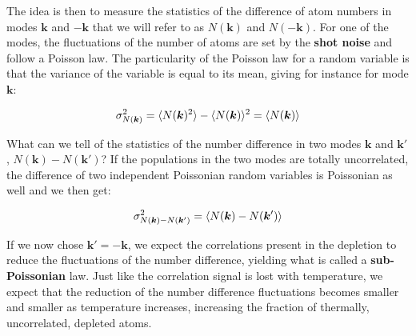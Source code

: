 

 The idea is then to measure the statistics of the difference of atom numbers in modes $\bm{k}$ and $-\bm{k}$ that we will refer to as $N(\bm{k})$ and $N(-\bm{k})$. For one of the modes, the fluctuations of the number of atoms are set by the \textbf{shot noise} and follow a Poisson law. The particularity of the Poisson law for a random variable is that the variance of the variable is equal to its mean, giving for instance for mode $\bm{k}$:

\begin{equation}
    \sigma_{N(\bm{k})}^2 =\langle N(\bm{k})^2\rangle-\langle N(\bm{k})\rangle^2 = \langle N(\bm{k})\rangle
\end{equation}

What can we tell of the statistics of the number difference in two modes $\bm{k}$ and $\bm{k}'$, $N(\bm{k}) - N(\bm{k}')$? If the populations in the two modes are totally uncorrelated, the difference of two independent Poissonian random variables is Poissonian as well and we then get:

\begin{equation}
    \sigma_{N(\bm{k})-N(\bm{k}')}^2 = \langle N(\bm{k})-N(\bm{k}')\rangle
\end{equation}

If we now chose $\bm{k}'=-\bm{k}$, we expect the \kmk correlations present in the depletion to reduce the fluctuations of the number difference, yielding what is called a \textbf{sub-Poissonian} law. Just like the \kmk correlation signal is lost with temperature, we expect that the reduction of the number difference fluctuations becomes smaller and smaller as temperature increases, increasing the fraction of thermally, uncorrelated, depleted atoms. 


